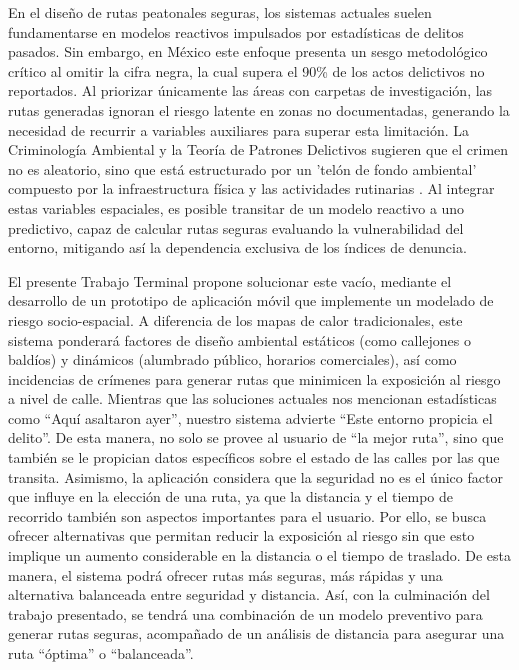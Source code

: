 
En el diseño de rutas peatonales seguras, los sistemas actuales suelen fundamentarse en modelos reactivos impulsados por estadísticas de delitos pasados. Sin embargo, en México este enfoque presenta un sesgo metodológico crítico al omitir la cifra negra, la cual supera el 90\% de los actos delictivos no reportados\cite[p. 23]{ENVIPE2025}. Al priorizar únicamente las áreas con carpetas de investigación, las rutas generadas ignoran el riesgo latente en zonas no documentadas, generando la necesidad de recurrir a variables auxiliares para superar esta limitación. La Criminología Ambiental y la Teoría de Patrones Delictivos sugieren que el crimen no es aleatorio, sino que está estructurado por un 'telón de fondo ambiental' compuesto por la infraestructura física y las actividades rutinarias \cite{brantingham1995criminality}.  Al integrar estas variables espaciales, es posible transitar de un modelo reactivo a uno predictivo, capaz de calcular rutas seguras evaluando la vulnerabilidad del entorno, mitigando así la dependencia exclusiva de los índices de denuncia.

El presente Trabajo Terminal propone solucionar este vacío, mediante el desarrollo de un prototipo de aplicación móvil que implemente un modelado de riesgo socio-espacial. A diferencia de los mapas de calor tradicionales, este sistema ponderará factores de diseño ambiental estáticos (como callejones o baldíos) y dinámicos (alumbrado público, horarios comerciales), así como incidencias de crímenes para generar rutas que minimicen la exposición al riesgo a nivel de calle. Mientras que las soluciones actuales nos mencionan estadísticas como “Aquí asaltaron ayer”, nuestro sistema advierte “Este entorno propicia el delito”. De esta manera, no solo se provee al usuario de “la mejor ruta”, sino que también se le propician datos específicos sobre el estado de las calles por las que transita. Asimismo, la aplicación considera que la seguridad no es el único factor que influye en la elección de una ruta, ya que la distancia y el tiempo de recorrido también son aspectos importantes para el usuario. Por ello, se busca ofrecer alternativas que permitan reducir la exposición al riesgo sin que esto implique un aumento considerable en la distancia o el tiempo de traslado. De esta manera, el sistema podrá ofrecer rutas más seguras, más rápidas y una alternativa balanceada entre seguridad y distancia. Así, con la culminación del trabajo presentado, se tendrá una combinación de un modelo preventivo para generar rutas seguras, acompañado de un análisis de distancia para asegurar una ruta “óptima” o “balanceada”.


